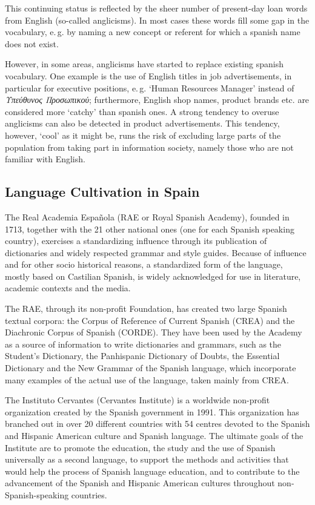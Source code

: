 \begin{multicols}{2}
This continuing status is reflected by the sheer number of present-day loan words from English (so-called anglicisms). In most cases these words fill some gap in the vocabulary, e.\,g. by naming a new concept or referent for which a spanish name does not exist.

However, in some areas, anglicisms have started to replace existing spanish vocabulary. One example is the use of English titles in job advertisements, in particular for executive positions, e.\,g. ‘Human Resources Manager’ instead of \textit{Υπεύθυνος Προσωπικού}; furthermore, English shop names, product brands etc. are considered more ‘catchy’ than spanish ones. A strong tendency to overuse anglicisms can also be detected in product advertisements. This tendency, however, ‘cool’ as it might be, runs the risk of excluding large parts of the population from taking part in information society, namely those who are not familiar with English.

\subsection{Language Cultivation in Spain}

The Real Academia Española (RAE or Royal Spanish Academy), founded in 1713, together with the 21 other national ones (one for each Spanish speaking country), exercises a standardizing influence through its publication of dictionaries and widely respected grammar and style guides. Because of influence and for other socio historical reasons, a standardized form of the language, mostly based on Castilian Spanish, is widely acknowledged for use in literature, academic contexts and the media. 


The RAE, through its non-profit Foundation, has created two large Spanish textual corpora: the  Corpus of Reference of Current Spanish (CREA) and the Diachronic Corpus of Spanish (CORDE). They have been used by the Academy as a source of  information to write dictionaries and grammars, such as the Student's Dictionary, the Panhispanic Dictionary of Doubts, the Essential Dictionary and the New Grammar of the Spanish language, which incorporate many examples of the actual use of the  language, taken mainly from CREA. 

The Instituto Cervantes (Cervantes Institute) is a worldwide non-profit organization created by the Spanish government in 1991. This organization has branched out in over 20 different countries with 54 centres devoted to the Spanish and Hispanic American culture and Spanish language. The ultimate goals of the Institute are to promote the education, the study and the use of Spanish universally as a second language, to support the methods and activities that would help the process of Spanish language education, and to contribute to the advancement of the Spanish and Hispanic American cultures throughout non-Spanish-speaking countries.


\end{multicols}
